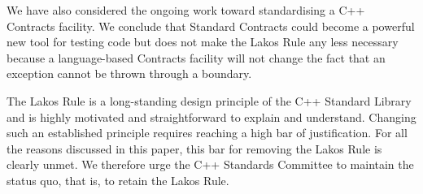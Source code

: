 We have also considered the ongoing work toward standardising a C++ Contracts facility. We conclude that Standard Contracts could become a powerful new tool for testing code but does not make the Lakos Rule any less necessary because a language-based Contracts facility will not change the fact that an exception cannot be thrown through a  boundary.

The Lakos Rule is a long-standing design principle of the C++ Standard Library and is highly motivated and straightforward to explain and understand. Changing such an established principle requires reaching a high bar of justification. For all the reasons discussed in this paper, this bar for removing the Lakos Rule is clearly unmet. We therefore urge the C++ Standards Committee to maintain the status quo, that is, to retain the Lakos Rule.





\renewcommand{\bibname}{References}




